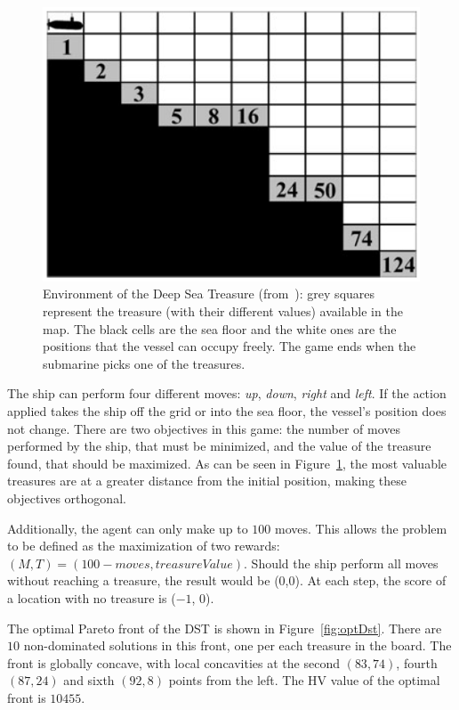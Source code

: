 \documentclass[journal]{IEEEtran}
\begin{document}
\begin{figure}[!t]
\begin{center}
\includegraphics[width=0.75\columnwidth]{img/dst}
\end{center}
\caption{Environment of the Deep Sea Treasure (from~\cite{Vamplew2010}): grey squares represent the treasure (with their different values) available in the map. The black cells are the sea floor and the white ones are the positions that the vessel can occupy freely. The game ends when the submarine picks one of the treasures.}
\label{fig:dstBase}
\end{figure}


The ship can perform four different moves: \textit{up}, \textit{down}, \textit{right}  and \textit{left}. If the action applied takes the ship off the grid or into the sea floor, the vessel's position does not change.  There are two objectives in this game: the number of moves performed by the ship, that must be minimized, and the value of the treasure found, that should be maximized. As can be seen in Figure~\ref{fig:dstBase}, the most valuable treasures are at a greater distance from the initial position, making these objectives orthogonal.

Additionally, the agent can only make up to $100$ moves. This allows the problem to be defined as the maximization of two rewards: $(M,T) = (100 - moves, treasureValue)$. Should the ship perform all moves without reaching a treasure, the result would be ($0$,$0$). At each step, the score of a location with no treasure is ($-1$, $0$).

The optimal Pareto front of the DST is shown in Figure~\ref{fig:optDst}. There are $10$ non-dominated solutions in this front, one per each treasure in the board. The front is globally concave, with local concavities at the second $(83,74)$, fourth $(87,24)$ and sixth $(92,8)$ points from the left. The HV value of the optimal front is $10455$.
\end{document}
